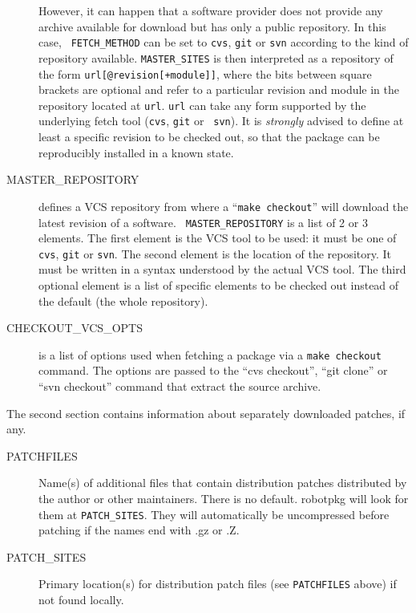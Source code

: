 \begin{description}
   However, it can happen that a software provider does not provide any archive
   available for download but has only a public repository. In this case, {\tt
   FETCH\_METHOD} can be set to {\tt cvs}, {\tt git} or {\tt svn} according to
   the kind of repository available. {\tt MASTER\_SITES} is then interpreted as
   a repository of the form {\tt url[@revision[+module]]}, where the bits
   between square brackets are optional and refer to a particular revision and
   module in the repository located at {\tt url}. {\tt url} can take any form
   supported by the underlying fetch tool ({\tt cvs}, {\tt git} or {\tt
   svn}). It is {\em strongly} advised to define at least a specific revision
   to be checked out, so that the package can be reproducibly installed in a
   known state.

   \smallbreak
   \item[MASTER\_REPOSITORY] defines a VCS repository from where a ``{\tt make
   checkout}'' will download the latest revision of a software. {\tt
   MASTER\_REPOSITORY} is a list of 2 or 3 elements. The first element is the
   VCS tool to be used: it must be one of {\tt cvs}, {\tt git} or {\tt svn}.
   The second element is the location of the repository. It must be written in
   a syntax understood by the actual VCS tool. The third optional element is a
   list of specific elements to be checked out instead of the default (the
   whole repository).

   \smallbreak
   \item[CHECKOUT\_VCS\_OPTS] is a list of options used when fetching a
   package via a {\tt make checkout} command. The options are passed to the
   ``cvs checkout'', ``git clone'' or ``svn checkout'' command that extract the
   source archive.

\end{description}

The second section contains information about separately downloaded patches, if any.

\begin{description}

   \item[PATCHFILES] Name(s) of additional files that contain distribution
   patches distributed by the author or other maintainers. There is no
   default. robotpkg will look for them at {\tt    PATCH\_SITES}. They will
   automatically be uncompressed before patching if    the names end with .gz
   or .Z.

   \smallbreak
   \item[PATCH\_SITES] Primary location(s) for distribution patch files (see
   {\tt PATCHFILES} above) if not found locally.

\end{description}

